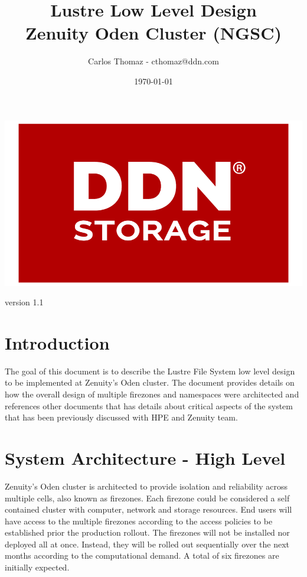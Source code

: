\documentclass{article}
\title{%
Lustre Low Level Design \\
\large Zenuity Oden Cluster (NGSC)}
\author{Carlos Thomaz - cthomaz@ddn.com}
\date{\today}
\begin{document}
\maketitle


\begin{center}
    \includegraphics[scale=0.14]{logo.png}\\[1cm] 
\end{center}
\begin{center}
version 1.1
\end{center}

\newpage

\begin{versionhistory}


\end{versionhistory}
\newpage

\tableofcontents

\newpage
\section{Introduction}
The goal of this document is to describe the Lustre File System low level design to be implemented at Zenuity's Oden cluster. The document provides details on how the overall design of multiple firezones and namespaces were architected and references other documents that has details about critical aspects of the system that has been previously discussed with HPE and Zenuity team.

\section{System Architecture - High Level}
Zenuity's Oden cluster is architected to provide isolation and reliability across multiple cells, also known as firezones. Each firezone could be considered a self contained cluster with computer, network and storage resources. End users will have access to the multiple firezones according to the access policies to be established prior the production rollout. The firezones will not be installed nor deployed all at once. Instead, they will be rolled out sequentially over the next months according to the computational demand. A total of six firezones are initially expected. 
\end{document}
